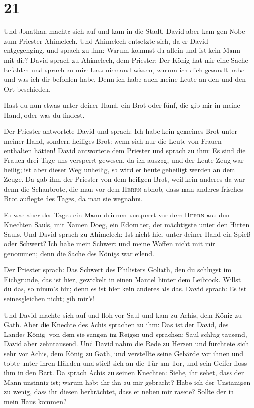 \hypertarget{section-20}{%
\section{21}\label{section-20}}

 Und Jonathan machte sich auf und kam in die Stadt.
 David aber kam gen Nobe zum Priester Ahimelech. Und
Ahimelech entsetzte sich, da er David entgegenging, und sprach zu ihm:
Warum kommst du allein und ist kein Mann mit dir?  David
sprach zu Ahimelech, dem Priester: Der König hat mir eine Sache befohlen
und sprach zu mir: Lass niemand wissen, warum ich dich gesandt habe und
was ich dir befohlen habe. Denn ich habe auch meine Leute an den und den
Ort beschieden.

 Hast du nun etwas unter deiner Hand, ein Brot oder fünf,
die gib mir in meine Hand, oder was du findest.

 Der Priester antwortete David und sprach: Ich habe kein
gemeines Brot unter meiner Hand, sondern heiliges Brot; wenn sich nur
die Leute von Frauen enthalten hätten!  David antwortete
dem Priester und sprach zu ihm: Es sind die Frauen drei Tage uns
versperrt gewesen, da ich auszog, und der Leute Zeug war heilig; ist
aber dieser Weg unheilig, so wird er heute geheiligt werden an dem
Zeuge.  Da gab ihm der Priester von dem heiligen Brot,
weil kein anderes da war denn die Schaubrote, die man vor dem
\textsc{Herrn} abhob, dass man anderes frisches Brot auflegte des Tages,
da man sie wegnahm.

 Es war aber des Tages ein Mann drinnen versperrt vor dem
\textsc{Herrn} aus den Knechten Sauls, mit Namen Doeg, ein Edomiter, der
mächtigste unter den Hirten Sauls.  Und David sprach zu
Ahimelech: Ist nicht hier unter deiner Hand ein Spieß oder Schwert? Ich
habe mein Schwert und meine Waffen nicht mit mir genommen; denn die
Sache des Königs war eilend.

 Der Priester sprach: Das Schwert des Philisters Goliath,
den du schlugst im Eichgrunde, das ist hier, gewickelt in einen Mantel
hinter dem Leibrock. Willst du das, so nimm's hin; denn es ist hier kein
anderes als das. David sprach: Es ist seinesgleichen nicht; gib mir's!

 Und David machte sich auf und floh vor Saul und kam zu
Achis, dem König zu Gath.  Aber die Knechte des Achis
sprachen zu ihm: Das ist der David, des Landes König, von dem sie sangen
im Reigen und sprachen: Saul schlug tausend, David aber zehntausend.
 Und David nahm die Rede zu Herzen und fürchtete sich
sehr vor Achis, dem König zu Gath,  und verstellte seine
Gebärde vor ihnen und tobte unter ihren Händen und stieß sich an die Tür
am Tor, und sein Geifer floss ihm in den Bart.  Da sprach
Achis zu seinen Knechten: Siehe, ihr sehet, dass der Mann unsinnig ist;
warum habt ihr ihn zu mir gebracht?  Habe ich der
Unsinnigen zu wenig, dass ihr diesen herbrächtet, dass er neben mir
rasete? Sollte der in mein Haus kommen?

